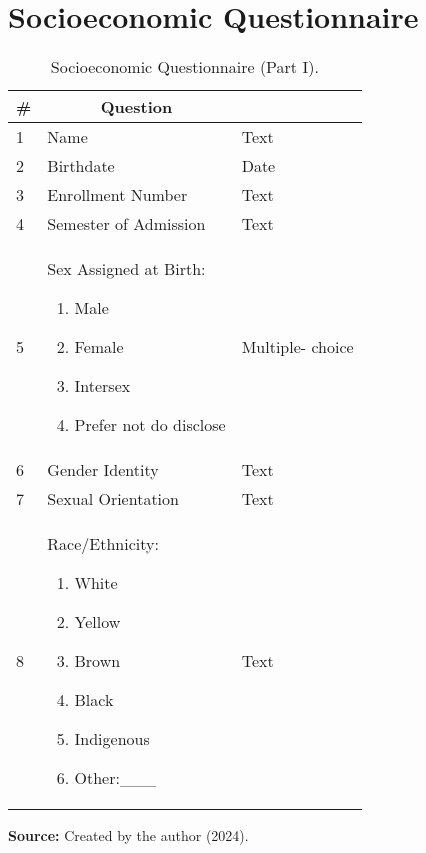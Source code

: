 \chapter{Socioeconomic Questionnaire}
\label{chap:socio-quest}

\begin{table}[ht]
\caption{Socioeconomic Questionnaire (Part I).}
\label{tbl:socioeconomic-questionnaire-part-i}
\centering
{}
\begin{tabular}{ 
    p{1cm}
    p{9.5cm}
    >{\centering\arraybackslash}m{2.5cm}}
\hline
\multicolumn{1}{c}{\textbf{\#}} & \multicolumn{1}{c}{\textbf{Question}} &
\multicolumn{1}{c}{\textbf{Type}} \\
\hline

1 & Name & Text\\
2 & Birthdate & Date\\
3 & Enrollment Number & Text\\
4 & Semester of Admission & Text\\
5 & Sex Assigned at Birth:
\begin{enumerate}[label=(\alph*)]
    \item Male
    \item Female
    \item Intersex
    \item Prefer not do disclose
\end{enumerate} &
Multiple- choice\\
6 & Gender Identity & Text\\
7 & Sexual Orientation & Text\\
8 & Race/Ethnicity:
\begin{enumerate}[label=(\alph*)]
    \item White
    \item Yellow
    \item Brown
    \item Black
    \item Indigenous
    \item Other:\_\_\_
\end{enumerate} &
Text \\

\hline



\end{tabular}

  \par\medskip\ABNTEXfontereduzida\selectfont\textbf{Source:} Created by the author (2024). \par\medskip
\end{table}

